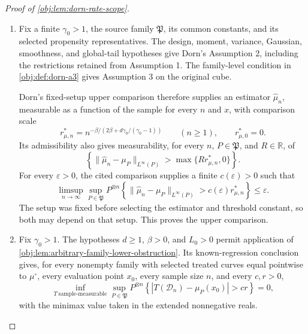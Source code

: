 \documentclass[11pt]{article}
\begin{document}
\begin{proof}[Proof of \cref{obj:lem:dorn-rate-scope}]
\begin{enumerate}
\item Fix a finite \(\gamma_0>1\), the source family \(\mathfrak P\), its common constants, and its selected propensity representatives. The design, moment, variance, Gaussian, smoothness, and global-tail hypotheses give Dorn's Assumption 2, including the restrictions retained from Assumption 1. The family-level condition in \cref{obj:def:dorn-a3} gives Assumption 3 on the original cube.

Dorn's fixed-setup upper comparison \citep[Section 2, Assumptions 1--3, Theorem 1(ii)]{Dorn2026GlobalOverlap} therefore supplies an estimator \(\widehat\mu_n\), measurable as a function of the sample for every \(n\) and \(x\), with comparison scale
\[
r^*_{\mu,n}
=
n^{-\beta/(2\beta+d\gamma_0/(\gamma_0-1))}
\qquad(n\ge1),
\qquad r^*_{\mu,0}=0.
\]
Its admissibility also gives measurability, for every \(n\), \(P\in\mathfrak P\), and \(R\in\mathbb R\), of
\[
\left\{
\|\widehat\mu_n-\mu_P\|_{L^\infty(P)}
>
\max\{Rr^*_{\mu,n},0\}
\right\}.
\]
For every \(\varepsilon>0\), the cited comparison supplies a finite \(c(\varepsilon)>0\) such that
\[
\limsup_{n\to\infty}\sup_{P\in\mathfrak P}
P^{\otimes n}\!\left\{
\|\widehat\mu_n-\mu_P\|_{L^\infty(P)}
>
c(\varepsilon)r^*_{\mu,n}
\right\}
\le\varepsilon.
\]
The setup was fixed before selecting the estimator and threshold constant, so both may depend on that setup. This proves the upper comparison.

\item Fix \(\gamma_0>1\). The hypotheses \(d\ge1\), \(\beta>0\), and \(L_0>0\) permit application of \cref{obj:lem:arbitrary-family-lower-obstruction}. Its known-regression conclusion gives, for every nonempty family with selected treated curves equal pointwise to \(\mu^\circ\), every evaluation point \(x_0\), every sample size \(n\), and every \(c,r>0\),
\[
\inf_{T\ \mathrm{sample\text{-}measurable}}
\sup_{P\in\mathfrak P}
P^{\otimes n}\!\left\{
|T(\mathcal D_n)-\mu_P(x_0)|>cr
\right\}
=0,
\]
with the minimax value taken in the extended nonnegative reals.


\end{enumerate}
\end{proof}
\end{document}
